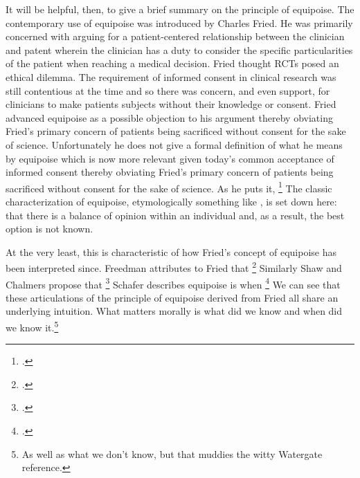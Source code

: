 \documentclass[letterpaper,notitlepage,12pt]{article}
\begin{document}
It will be helpful, then, to give a brief summary on the principle of equipoise.
The contemporary use of equipoise was introduced by Charles Fried.
He was primarily concerned with arguing for a patient-centered relationship
between the clinician and patent wherein the clinician has a duty to consider
the specific particularities of the patient when reaching a medical decision.
Fried thought RCTs posed an ethical dilemma. 
The requirement of informed consent in clinical research was still
contentious at the time and so there was concern, and even support, for
clinicians to make patients subjects without their knowledge or consent.
Fried advanced equipoise as a possible objection to his argument thereby
obviating Fried's primary concern of patients being sacrificed without consent
for the sake of science.
Unfortunately he does not give a formal definition of what
he means by equipoise which is now more relevant given today's common acceptance
of informed consent thereby obviating Fried's primary concern of patients being
sacrificed without consent for the sake of science.
As he puts it, \footcite[p. 58]{fried_medical_2016}
The classic characterization of equipoise, etymologically something like
, is set down here: that there is a balance of opinion
within an individual and, as a result, the best option is not known.

At the very least, this is characteristic of how Fried's concept of equipoise
has been interpreted since.
Freedman attributes to Fried that \footcite[p.
141]{freedman_equipoise_1987}
Similarly Shaw and Chalmers propose that \footcite[p.487]{shaw_ethics_1970}
Schafer describes equipoise is when \footcite[p.
4]{schafer_commentary_1985}
We can see that these articulations of the principle of equipoise derived
from Fried all share an underlying intuition.
What matters morally is what did we know and when did we know it.\footnote{As
well as what we don't know, but that muddies the witty Watergate reference.}
\end{document}

